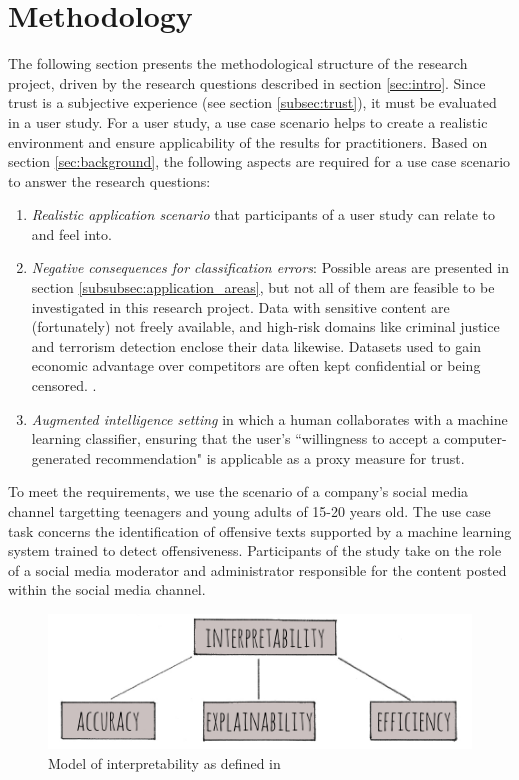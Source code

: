 \section{Methodology}
\label{sec:method}
The following section presents the methodological structure of the research project, driven by the research questions described in section \ref{sec:intro}.\newline
Since trust is a subjective experience (see section \ref{subsec:trust}), it must be evaluated in a user study. For a user study, a use case scenario helps to create a realistic environment and ensure applicability of the results for practitioners. Based on section \ref{sec:background}, the following aspects are required for a use case scenario to answer the research questions:
\begin{enumerate}
	\item \textit{Realistic application scenario} that participants of a user study can relate to and feel into.
	\item \textit{Negative consequences for classification errors}: Possible areas are presented in section \ref{subsubsec:application_areas}, but not all of them are feasible to be investigated in this research project. Data with sensitive content are (fortunately) not freely available, and high-risk domains like criminal justice and terrorism detection enclose their data likewise. Datasets used to gain economic advantage over competitors are often kept confidential or being censored. \cite{diakopoulos2016accountability}.
	\item \textit{Augmented intelligence setting} in which a human collaborates with a machine learning classifier, ensuring that the user's ``willingness to accept a computer-generated recommendation" \cite{vorm2018assessing} is applicable as a proxy measure for trust.
\end{enumerate}
To meet the requirements, we use the scenario of a company's social media channel targetting teenagers and young adults of 15-20 years old. The use case task concerns the identification of offensive texts supported by a machine learning system trained to detect offensiveness. Participants of the study take on the role of a social media moderator and administrator responsible for the content posted within the social media channel. 
\begin{figure} [H]
	\centering
	\includegraphics[width=0.7\linewidth]{img/model2}
	\caption{Model of interpretability as defined in \cite{ruping2006learning}}
	\label{fig:model_interpretability}
\end{figure}
